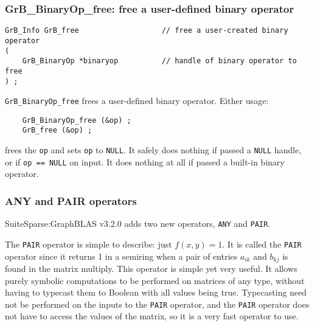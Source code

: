 \documentclass[12pt]{article}
\begin{document}
\newpage
\subsubsection{{\sf GrB\_BinaryOp\_free:} free a user-defined binary operator}
\label{binaryop_free}

\begin{mdframed}[userdefinedwidth=6in]
{\footnotesize
\begin{verbatim}
GrB_Info GrB_free                   // free a user-created binary operator
(
    GrB_BinaryOp *binaryop          // handle of binary operator to free
) ;
\end{verbatim}
} \end{mdframed}

\verb'GrB_BinaryOp_free' frees a user-defined binary operator.
Either usage:

    {\small
    \begin{verbatim}
    GrB_BinaryOp_free (&op) ;
    GrB_free (&op) ; \end{verbatim}}

\noindent
frees the \verb'op' and sets \verb'op' to \verb'NULL'.
It safely does nothing if passed a \verb'NULL'
handle, or if \verb'op == NULL' on input.
It does nothing at all if passed a built-in binary operator.

\subsubsection{{\sf ANY} and {\sf PAIR} operators}
\label{any_pair}

SuiteSparse:GraphBLAS v3.2.0 adds two new operators, \verb'ANY' and
\verb'PAIR'.

The \verb'PAIR' operator is simple to describe: just $f(x,y)=1$.  It is called
the \verb'PAIR' operator since it returns 1 in a semiring when a pair of
entries $a_{ik}$ and $b_{kj}$ is found in the matrix multiply.  This operator
is simple yet very useful.  It allows purely symbolic computations to be
performed on matrices of any type, without having to typecast them to Boolean
with all values being true.  Typecasting need not be performed on the inputs to
the \verb'PAIR' operator, and the \verb'PAIR' operator does not have to access
the values of the matrix, so it is a very fast operator to use.
\end{document}
